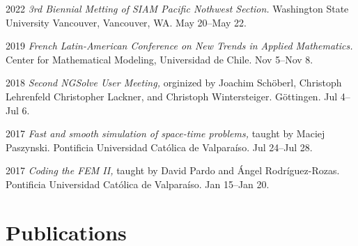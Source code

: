 \documentclass[12pt,letterpaper]{report}
\begin{document}
    \begin{tablist}

	\item[2022] \tab \emph{3rd Biennial Metting of SIAM Pacific Nothwest Section.} Washington State University Vancouver, Vancouver, WA. May 20--May 22.

        \item[2019] \tab \emph{French Latin-American Conference on New Trends in Applied Mathematics.} Center for Mathematical Modeling, Universidad de Chile. Nov 5--Nov 8.

        
        \item[2018] \tab \emph{Second NGSolve User Meeting,} orginized by Joachim Schöberl, Christoph Lehrenfeld
        Christopher Lackner, and Christoph Wintersteiger. Göttingen. Jul 4--Jul 6. 

        
        \item[2017] \tab \emph{Fast and smooth simulation of space-time problems,} taught by Maciej Paszynski. Pontificia Universidad Cat\'olica de Valpara\'iso. Jul 24--Jul 28.
        
        \item[2017] \tab \emph{Coding the FEM II,} taught by David Pardo and \'Angel Rodr\'iguez-Rozas. Pontificia Universidad Cat\'olica de Valpara\'iso. Jan 15--Jan 20. 

        

    \end{tablist}

    \section*{Publications}
\end{document}
